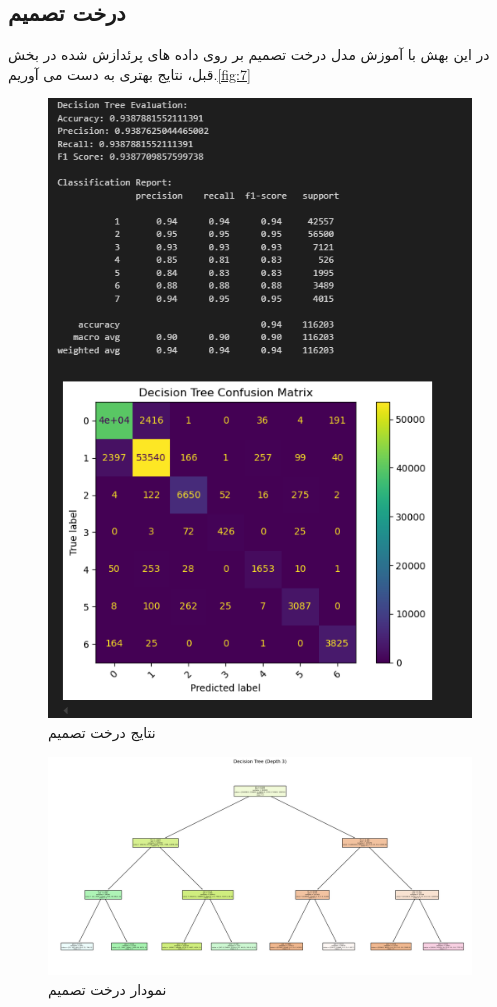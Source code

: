 \documentclass{article}
\begin{document}
\subsection{درخت تصمیم}
در این بهش با آموزش مدل درخت تصمیم بر روی داده های پرئدازش شده در بخش قبل، نتایج بهتری به دست می آوریم.\autoref{fig:7}
\begin{figure}[h!]
	\centering
	\includegraphics[width=0.7\linewidth]{7}
	\caption[]{نتایج درخت تصمیم}
	\label{fig:7}
\end{figure}
\clearpage
\begin{figure}[h!]
	\centering
	\includegraphics[width=1\linewidth]{8}
	\caption[]{نمودار درخت تصمیم}
	\label{fig:8}
\end{figure}
\end{document}
